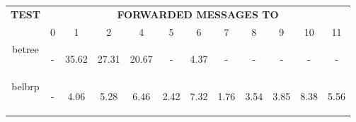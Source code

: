 \documentclass{article}
\begin{document}
		\begin{table}[H]
			\begin{center}
			    \begin{tabular}{|c|c|c|c|c|c|c|c|c|c|c|c|}
				    \hline
				    \multirow{2}{*}{\textbf{TEST}} & \multicolumn{11}{c|}{\textbf{FORWARDED MESSAGES TO}} \\ \cline{2-12}
					& 0 & 1 & 2 & 4 & 5 & 6 & 7 & 8 & 9 & 10 & 11\\ \hline
				    betree & \begin{footnotesize}-\end{footnotesize} & \begin{footnotesize}35.62\end{footnotesize} & \begin{footnotesize}27.31\end{footnotesize} & \begin{footnotesize}20.67\end{footnotesize} & \begin{footnotesize}-\end{footnotesize} & \begin{footnotesize}4.37\end{footnotesize} & \begin{footnotesize}-\end{footnotesize} & \begin{footnotesize}-\end{footnotesize} & \begin{footnotesize}-\end{footnotesize} & \begin{footnotesize}-\end{footnotesize} & \begin{footnotesize}-\end{footnotesize}\\ \hline
				    belbrp & \begin{footnotesize}-\end{footnotesize} & \begin{footnotesize}4.06\end{footnotesize} & \begin{footnotesize}5.28\end{footnotesize} & \begin{footnotesize}6.46\end{footnotesize} & \begin{footnotesize}2.42\end{footnotesize} & \begin{footnotesize}7.32\end{footnotesize} & \begin{footnotesize}1.76\end{footnotesize} & \begin{footnotesize}3.54\end{footnotesize} & \begin{footnotesize}3.85\end{footnotesize} & \begin{footnotesize}8.38\end{footnotesize} & \begin{footnotesize}5.56\end{footnotesize}\\ \hline

\end{tabular}
\end{center}
\end{table}
\end{document}
